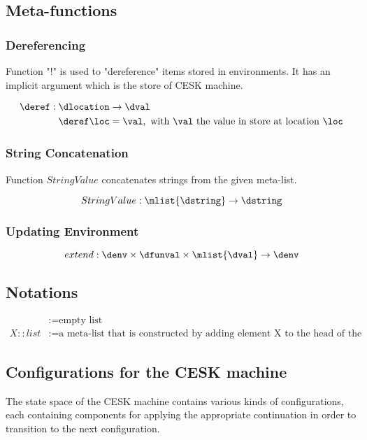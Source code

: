 \documentclass{article}
\begin{document}
\subsection{Meta-functions}
\subsubsection{Dereferencing}
\label{subsubsection:dereferecing}
Function "!" is used to "dereference" items stored in environments. It has an implicit argument which is the store of CESK machine.

\begin{align*}
\deref : \dlocation &\rightarrow \dval \\
\deref\loc &=  \val, \textrm{ with $\val$ the value in store at location } \loc
\end{align*}

\subsubsection{String Concatenation}
Function $StringValue$ concatenates strings from the given meta-list.

\[StringValue : \mlist{\dstring} \rightarrow \dstring\]

\subsubsection{Updating Environment}

\[extend : \denv \times \dfunval \times \mlist{\dval} \rightarrow  \denv \]

\subsection{Notations}
\begin{align*}
[]	&:= \textrm{empty list} \\
X :: list	&:= \textrm{a meta-list that is constructed by adding element X to the head of the meta-list list}
\end{align*}

\subsection{Configurations for the CESK machine}
The state space of the CESK machine contains various kinds of configurations, each containing components for applying the appropriate continuation in order to transition to the next configuration. 
\end{document}
